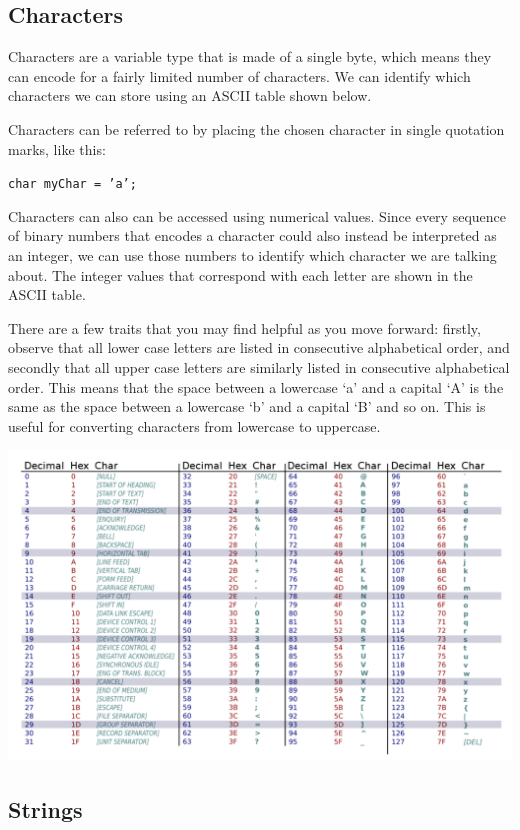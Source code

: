 \subsection{Characters}

Characters are a variable type that is made of a single byte, which means they can encode for a fairly limited number of characters. We can identify which characters we can store using an ASCII table shown below. 

Characters can be referred to by placing the chosen character in single quotation marks, like this:

\texttt{char myChar = 'a';}

Characters can also can be accessed using numerical values. Since every sequence of binary numbers that encodes a character could also instead be interpreted as an integer, we can use those numbers to identify which character we are talking about. The integer values that correspond with each letter are shown in the ASCII table.

There are a few traits that you may find helpful as you move forward: firstly, observe that all lower case letters are listed in consecutive alphabetical order, and secondly that all upper case letters are similarly listed in consecutive alphabetical order. This means that the space between a lowercase `a' and a capital `A' is the same as the space between a lowercase `b' and a capital `B' and so on. This is useful for converting characters from lowercase to uppercase. 

\includegraphics[width=\textwidth]{images/ascii_table.png}

\subsection{Strings}

